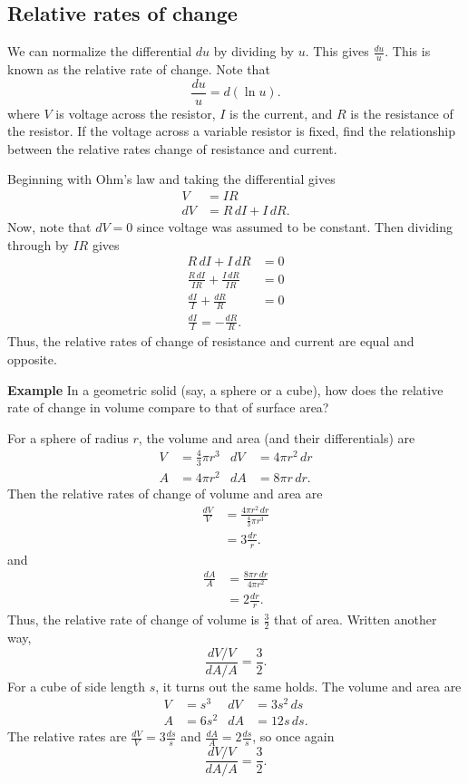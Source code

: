 \documentclass[twoside,openright,titlepage,a4paper]{book}
\begin{document}
\begin{sloppypar}
\subsection{Relative rates of change}

We can normalize the differential $du$ by dividing by $u$. This gives $\frac{du}{u}$. This is known as the relative rate of change. Note that \[\frac{du}{u} = d(\ln u).\] where $V$ is voltage across the resistor, $I$ is the current, and $R$ is the resistance of the resistor. If the voltage across a variable resistor is fixed, find the relationship between the relative rates change of resistance and current.
\begin{examplebox}
Beginning with Ohm's law and taking the differential gives
\begin{align*}
V &= IR \\
dV &= R \, dI + I \, dR. 
\end{align*}
Now, note that $dV = 0$ since voltage was assumed to be constant. Then dividing through by $IR$ gives
\begin{align*}
R \, dI + I \, dR &= 0 \\
\frac{R \, dI}{IR} + \frac{I \, dR}{IR} &= 0 \\
\frac{dI}{I} + \frac{dR}{R} &= 0 \\
\frac{dI}{I} = -\frac{dR}{R}. 
\end{align*}
Thus, the relative rates of change of resistance and current are equal and opposite.	
\end{examplebox}

\textbf{Example} In a geometric solid (say, a sphere or a cube), how does the relative rate of change in volume compare to that of surface area?
\begin{examplebox}
For a sphere of radius $r$, the volume and area (and their differentials) are
\begin{align*}
V &= \frac{4}{3}\pi r^3 & dV &= 4\pi r^2 \, dr \\
A &= 4\pi r^2 & dA &= 8\pi r \, dr. 
\end{align*}
Then the relative rates of change of volume and area are
\begin{align*}
\frac{dV}{V} &= \frac{4\pi r^2 \, dr}{\frac{4}{3}\pi r^3} \\
&= 3 \frac{dr}{r}.
\end{align*}
and
\begin{align*}
\frac{dA}{A} &= \frac{8 \pi r \, dr}{4 \pi r^2} \\
&= 2 \frac{dr}{r}.
\end{align*}
Thus, the relative rate of change of volume is $\frac{3}{2}$ that of area. Written another way, \[ \frac{dV/V}{dA/A} = \frac{3}{2}. \]
For a cube of side length $s$, it turns out the same holds. The volume and area are
\begin{align*}
V &= s^3 & dV &= 3s^2 \, ds \\
A &= 6 s^2 & dA &= 12 s \, ds. 
\end{align*}
The relative rates are $\frac{dV}{V} = 3 \frac{ds}{s}$ and $\frac{dA}{A} = 2 \frac{ds}{s}$, so once again \[ \frac{dV/V}{dA/A} = \frac{3}{2}. \]	
\end{examplebox}


\end{sloppypar}
\end{document}
